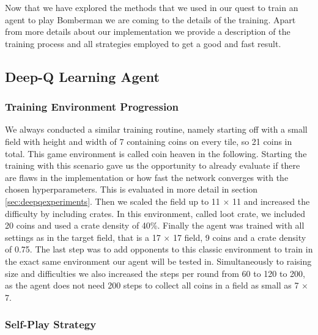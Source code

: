 
Now that we have explored the methods that we used in our quest to train an agent to play Bomberman we are coming to the details of the training. Apart from more details about our implementation we provide a description of the training process and all strategies employed to get a good and fast result.

\subsection{Deep-Q Learning Agent} \label{sec:deepqtraining}

\subsubsection{Training Environment Progression}

We always conducted a similar training routine, namely starting off with a small field with height and width of 7 containing coins on every tile, so 21 coins in total. This game environment is called coin heaven in the following. Starting the training with this scenario gave us the opportunity to already evaluate if there are flaws in the implementation or how fast the network converges with the chosen hyperparameters. This is evaluated in more detail in section \ref{sec:deepqexperiments}. Then we scaled the field up to 11 $\times$ 11 and increased the difficulty by including crates. In this environment, called loot crate, we included 20 coins and used a crate density of 40\%. Finally the agent was trained with all settings as in the target field, that is a 17 $\times$ 17 field, 9 coins and a crate density of 0.75. The last step was to add opponents to this classic environment to train in the exact same environment our agent will be tested in. Simultaneously to raising size and difficulties we also increased the steps per round from 60 to 120 to 200, as the agent does not need 200 steps to collect all coins in a field as small as 7 $\times$ 7.

\subsubsection{Self-Play Strategy}


